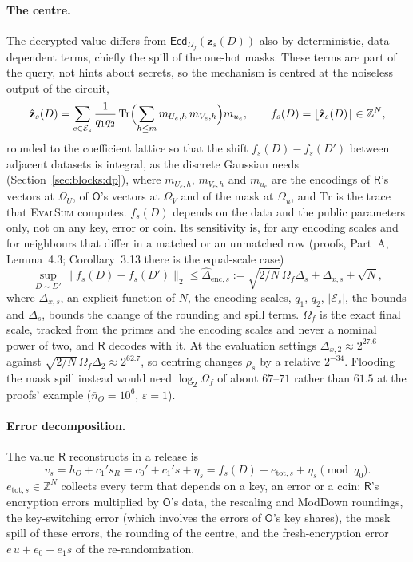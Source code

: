 \documentclass[11pt]{article}
\theoremstyle{definition}
\theoremstyle{plain}
\newcommand{\Z}{\mathbb{Z}}
\newcommand{\Ecd}{\mathsf{Ecd}}
\newcommand{\Party}[1]{\textsf{#1}}
\newcommand{\Rp}{\Party{R}}
\newcommand{\Op}{\Party{O}}
\begin{document}
\paragraph{The centre.} The decrypted value differs from $\Ecd_{\Omega_f}(\mathbf z_s(D))$ also by deterministic, data-dependent terms, chiefly the spill of the one-hot masks. These terms are part of the query, not hints about secrets, so the mechanism is centred at the noiseless output of the circuit,
\[
  \hat{\mathbf z}_s(D) = \sum_{e \in \mathcal E_s}\frac{1}{q_1q_2}\,\mathrm{Tr}\Bigl(\sum_{h \le m} m_{U_e,h}\,m_{V_e,h}\Bigr)m_{u_e}, \qquad
  f_s(D) = \lfloor \hat{\mathbf z}_s(D) \rceil \in \Z^N,
\]
rounded to the coefficient lattice so that the shift $f_s(D) - f_s(D')$ between adjacent datasets is integral, as the discrete Gaussian needs (Section~\ref{sec:blocks:dp}), where $m_{U_e,h}$, $m_{V_e,h}$ and $m_{u_e}$ are the encodings of $\Rp$'s vectors at $\Omega_U$, of $\Op$'s vectors at $\Omega_V$ and of the mask at $\Omega_u$, and $\mathrm{Tr}$ is the trace that \textsc{EvalSum} computes. $f_s(D)$ depends on the data and the public parameters only, not on any key, error or coin. Its sensitivity is, for any encoding scales and for neighbours that differ in a matched or an unmatched row (proofs, Part~A, Lemma~4.3; Corollary~3.13 there is the equal-scale case)
\begin{equation}
  \sup_{D \sim D'}\|f_s(D) - f_s(D')\|_2 \le \widehat\Delta_{\mathrm{enc},s} := \sqrt{2/N}\,\Omega_f\Delta_s + \Delta_{x,s} + \sqrt N,
  \label{eq:denc}
\end{equation}
where $\Delta_{x,s}$, an explicit function of $N$, the encoding scales, $q_1$, $q_2$, $|\mathcal E_s|$, the bounds and $\Delta_s$, bounds the change of the rounding and spill terms. $\Omega_f$ is the exact final scale, tracked from the primes and the encoding scales and never a nominal power of two, and $\Rp$ decodes with it. At the evaluation settings $\Delta_{x,2} \approx 2^{27.6}$ against $\sqrt{2/N}\,\Omega_f\Delta_2 \approx 2^{62.7}$, so centring changes $\rho_s$ by a relative $2^{-34}$. Flooding the mask spill instead would need $\log_2\Omega_f$ of about $67$--$71$ rather than $61.5$ at the proofs' example ($\bar n_O = 10^6$, $\varepsilon = 1$).

\paragraph{Error decomposition.} The value $\Rp$ reconstructs in a release is
\[
  v_s = h_O + c_1' s_R = c_0' + c_1' s + \eta_s = f_s(D) + e_{\mathrm{tot},s} + \eta_s \pmod{q_0}.
\]
$e_{\mathrm{tot},s} \in \Z^N$ collects every term that depends on a key, an error or a coin: $\Rp$'s encryption errors multiplied by $\Op$'s data, the rescaling and ModDown roundings, the key-switching error (which involves the errors of $\Op$'s key shares), the mask spill of these errors, the rounding of the centre, and the fresh-encryption error $e\,u + e_0 + e_1 s$ of the re-randomization.
\end{document}
